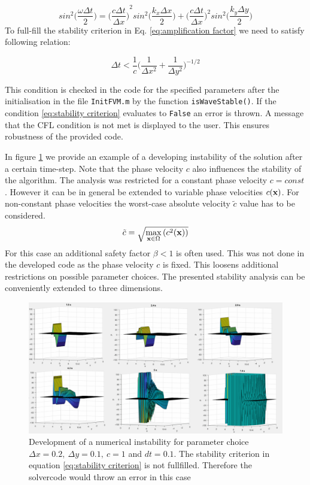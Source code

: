 \documentclass[fleqn,12pt]{NTFD} %
\begin{document}
\begin{equation}
sin^2 \Bigg ( \frac{\omega \Delta t}{2}\Bigg) = {\Bigg ( \frac{c \Delta t}{\Delta x} \Bigg)}^2 sin^2 \Bigg( \frac{k_x \Delta x}{2} \Bigg) + \Bigg(\frac{c \Delta t}{\Delta x}\Bigg)^2 sin^2 \Bigg(\frac{k_y \Delta y}{2} \Bigg)
\end{equation}
To full-fill the stability criterion in Eq. \ref{eq:amplification factor} we need to satisfy following relation: 

\begin{equation} \label{eq:stability criterion}
\Delta t < \frac{1}{c} \Bigg(\frac{1}{\Delta x^2} + \frac{1}{\Delta y^2} \Bigg)^{-1/2}
\end{equation}

This condition is checked in the code for the specified parameters after the initialisation in the file \texttt{InitFVM.m}  by the function \texttt{isWaveStable()}. If the condition \ref{eq:stability criterion} evaluates to \texttt{False} an error is thrown. A message that the CFL condition is not met is displayed to the user. This ensures robustness of the provided code. 

In figure \ref{fig:instability} we provide an example of a developing instability of the solution after a certain time-step. Note that the phase velocity $c$ also influences the stability of the algorithm. The analysis was restricted for a constant phase velocity $c = const$. However it can be in general be extended to variable phase velocities $c(\vb{x})$. For non-constant phase velocities the worst-case absolute velocity $\tilde{c}$ value has to be considered.  $$ \tilde{c} = \sqrt{\max_{{\vb{x}} \in \Omega}{( c^2(\vb{x})})}$$
For this case an additional safety factor  $\beta < 1$ is often used. This was not done in the developed code as the phase velocity $c$ is fixed. This loosens additional restrictions on possible parameter choices. The presented stability analysis can be conveniently extended to three dimensions. 


\begin{figure}[ht]\centering %
\includegraphics[width=\linewidth]{instability.png}
\caption{Development of a numerical instability for parameter choice $\Delta x = 0.2, \ \Delta y = 0.1, \ c = 1 $ and $dt = 0.1$. The stability criterion in equation \ref{eq:stability criterion} is not fullfilled. Therefore the solvercode would throw an error in this case}
\label{fig:instability}
\end{figure}
\end{document}
